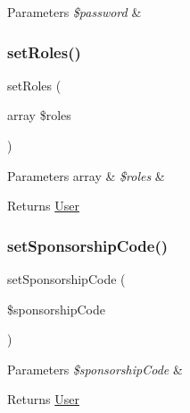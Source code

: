 \begin{DoxyParams}{Parameters}
{\em \$password} & \\
\hline
\end{DoxyParams}
\mbox{\label{class_app_1_1_entity_1_1_user_aa3236c9c6688d04df16ea0ab3065530e}} 
\subsubsection{\texorpdfstring{setRoles()}{setRoles()}}
{\footnotesize\ttfamily set\+Roles (\begin{DoxyParamCaption}\item[{array}]{\$roles }\end{DoxyParamCaption})}


\begin{DoxyParams}[1]{Parameters}
array & {\em \$roles} & \\
\hline
\end{DoxyParams}
\begin{DoxyReturn}{Returns}
\mbox{\hyperlink{class_app_1_1_entity_1_1_user}{User}} 
\end{DoxyReturn}
\mbox{\label{class_app_1_1_entity_1_1_user_a3b5111e3ac63bc4e9907ee56dd47703e}} 
\subsubsection{\texorpdfstring{setSponsorshipCode()}{setSponsorshipCode()}}
{\footnotesize\ttfamily set\+Sponsorship\+Code (\begin{DoxyParamCaption}\item[{}]{\$sponsorship\+Code }\end{DoxyParamCaption})}


\begin{DoxyParams}{Parameters}
{\em \$sponsorship\+Code} & \\
\hline
\end{DoxyParams}
\begin{DoxyReturn}{Returns}
\mbox{\hyperlink{class_app_1_1_entity_1_1_user}{User}} 
\end{DoxyReturn}
\mbox{\label{class_app_1_1_entity_1_1_user_a708280d4252b9b6b6a574a393c69b865}} 
